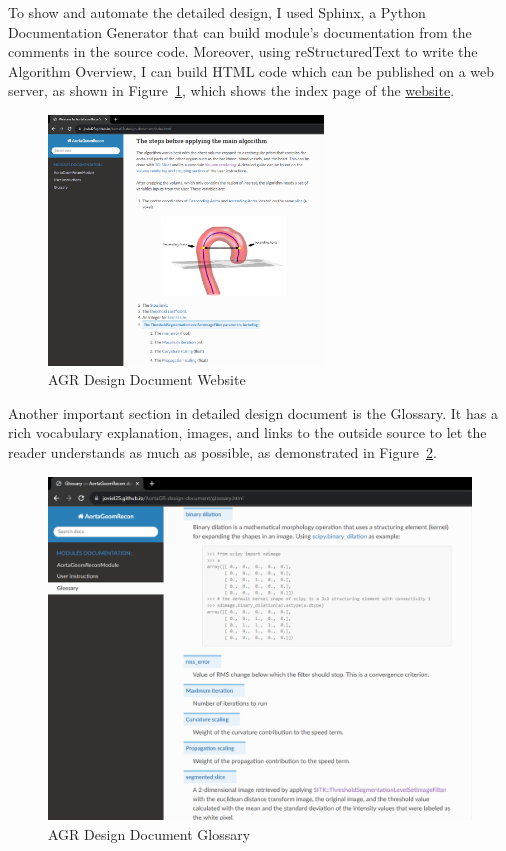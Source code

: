 To show and automate the detailed design, I used Sphinx, a Python Documentation Generator that can build module's documentation from the comments in the source code. Moreover, using reStructuredText to write the Algorithm Overview, I can build HTML code which can be published on a web server, as shown in Figure~\ref{fig_agr_dd}, which shows the index page of the \href{https://joviel25.github.io/AortaGR-design-document/index.html}{website}. 

\begin{figure}[H]
    \centering
    \includegraphics[width=0.65\textwidth]{figures/AC/DD/Main_page.png}
    \caption[AGR Design Document Website]{AGR Design Document Website}
    \label{fig_agr_dd}
\end{figure}

Another important section in detailed design document is the Glossary. It has a rich vocabulary explanation, images, and links to the outside source to let the reader understands as much as possible, as demonstrated in Figure~\ref{fig_agr_dd_glossary}.

\begin{figure}[H]
    \centering
    \includegraphics[width=\textwidth]{figures/AC/DD/Glossary.png}
    \caption[AGR Design Document Glossary]{AGR Design Document Glossary}
    \label{fig_agr_dd_glossary}
\end{figure}


